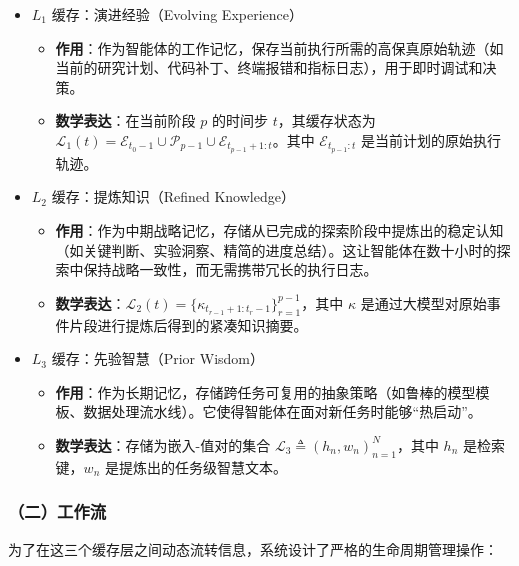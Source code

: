 \begin{itemize}
\tightlist
\item
  \(L_1\) 缓存：演进经验（Evolving Experience）

  \begin{itemize}
  \tightlist
  \item
    \textbf{作用}：作为智能体的工作记忆，保存当前执行所需的高保真原始轨迹（如当前的研究计划、代码补丁、终端报错和指标日志），用于即时调试和决策。
  \item
    \textbf{数学表达}：在当前阶段 \(p\) 的时间步 \(t\)，其缓存状态为 \(\mathcal{L}_1(t)=\mathcal{E}_{t_0-1}\cup\mathcal{P}_{p-1}\cup\mathcal{E}_{t_{p-1}+1:t}\)。其中 \(\mathcal{E}_{t_{p-1}:t}\) 是当前计划的原始执行轨迹。
  \end{itemize}
\item
  \(L_2\) 缓存：提炼知识（Refined Knowledge）

  \begin{itemize}
  \tightlist
  \item
    \textbf{作用}：作为中期战略记忆，存储从已完成的探索阶段中提炼出的稳定认知（如关键判断、实验洞察、精简的进度总结）。这让智能体在数十小时的探索中保持战略一致性，而无需携带冗长的执行日志。
  \item
    \textbf{数学表达}：\(\mathcal{L}_2(t)=\{\kappa_{t_{r-1}+1:t_r-1}\}_{r=1}^{p-1}\)，其中 \(\kappa\) 是通过大模型对原始事件片段进行提炼后得到的紧凑知识摘要。
  \end{itemize}
\item
  \(L_3\) 缓存：先验智慧（Prior Wisdom）

  \begin{itemize}
  \tightlist
  \item
    \textbf{作用}：作为长期记忆，存储跨任务可复用的抽象策略（如鲁棒的模型模板、数据处理流水线）。它使得智能体在面对新任务时能够``热启动''。
  \item
    \textbf{数学表达}：存储为嵌入-值对的集合 \(\mathcal{L}_3\triangleq(h_n,w_n)_{n=1}^{N}\)，其中 \(h_n\) 是检索键，\(w_n\) 是提炼出的任务级智慧文本。
  \end{itemize}
\end{itemize}

\hypertarget{ux4e8cux5de5ux4f5cux6d41-3}{%
\subsubsection{（二）工作流}\label{ux4e8cux5de5ux4f5cux6d41-3}}

为了在这三个缓存层之间动态流转信息，系统设计了严格的生命周期管理操作：

